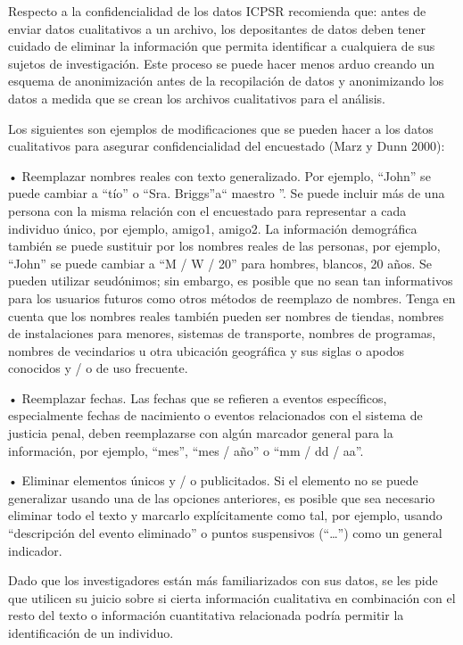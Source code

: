 \documentclass[
  14pt,
]{book}
\begin{document}
Respecto a la confidencialidad de los datos ICPSR recomienda que: antes de enviar datos cualitativos a un archivo, los depositantes de datos deben tener cuidado de eliminar la información que permita identificar a cualquiera de sus sujetos de investigación. Este proceso se puede hacer menos arduo creando un esquema de anonimización antes de la recopilación de datos y anonimizando los datos a medida que se crean los archivos cualitativos para el análisis.

Los siguientes son ejemplos de modificaciones que se pueden hacer a los datos cualitativos para asegurar
confidencialidad del encuestado (Marz y Dunn 2000):

• Reemplazar nombres reales con texto generalizado. Por ejemplo, ``John'' se puede cambiar a ``tío'' o ``Sra. Briggs''a`` maestro ''. Se puede incluir más de una persona con la misma relación con el encuestado para representar a cada individuo único, por ejemplo, amigo1, amigo2. La información demográfica también se puede sustituir por los nombres reales de las personas, por ejemplo, ``John'' se puede cambiar a ``M / W / 20'' para hombres, blancos, 20 años. Se pueden utilizar seudónimos; sin embargo, es posible que no sean tan informativos para los usuarios futuros como otros métodos de reemplazo de nombres. Tenga en cuenta que los nombres reales también pueden ser nombres de tiendas, nombres de instalaciones para menores, sistemas de transporte, nombres de programas, nombres de vecindarios u otra ubicación geográfica y sus siglas o apodos conocidos y / o de uso frecuente.

• Reemplazar fechas. Las fechas que se refieren a eventos específicos, especialmente fechas de nacimiento o eventos relacionados con el sistema de justicia penal, deben reemplazarse con algún marcador general para la información, por ejemplo, ``mes'', ``mes / año'' o ``mm / dd / aa''.

• Eliminar elementos únicos y / o publicitados. Si el elemento no se puede generalizar usando una de las opciones anteriores, es posible que sea necesario eliminar todo el texto y marcarlo explícitamente como tal, por ejemplo, usando ``descripción del evento eliminado'' o puntos suspensivos (``\ldots{}'') como un general
indicador.

Dado que los investigadores están más familiarizados con sus datos, se les pide que utilicen su juicio sobre si cierta información cualitativa en combinación con el resto del texto o información cuantitativa relacionada podría permitir la identificación de un individuo.
\end{document}
